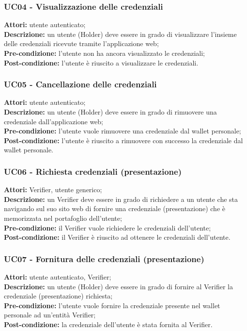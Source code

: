 \subsubsection{UC04 - Visualizzazione delle credenziali}
\textbf{Attori:} utente autenticato;\\
\textbf{Descrizione:} un utente (Holder) deve essere in grado di visualizzare l'insieme delle credenziali ricevute tramite l'applicazione web;\\
\textbf{Pre-condizione:} l’utente non ha ancora visualizzato le credenziali;\\
\textbf{Post-condizione:} l’utente è riuscito a visualizzare le credenziali.

\subsubsection{UC05 - Cancellazione delle credenziali}
\textbf{Attori:} utente autenticato;\\
\textbf{Descrizione:} un utente (Holder) deve essere in grado di rimuovere una credenziale dall'applicazione web;\\
\textbf{Pre-condizione:} l’utente vuole rimuovere una credenziale dal wallet personale;\\
\textbf{Post-condizione:} l’utente è riuscito a rimuovere con successo la credenziale dal wallet personale.

\subsubsection{UC06 - Richiesta credenziali (presentazione)}
\textbf{Attori:} Verifier, utente generico;\\
\textbf{Descrizione:} un Verifier deve essere in grado di richiedere a un utente che sta navigando sul suo sito web di fornire una credenziale (presentazione) che è memorizzata nel portafoglio dell'utente;\\
\textbf{Pre-condizione:} il Verifier vuole richiedere le credenziali dell’utente;\\
\textbf{Post-condizione:} il Verifier è riuscito ad ottenere le credenziali dell’utente.

\subsubsection{UC07 - Fornitura delle credenziali (presentazione)}
\textbf{Attori:} utente autenticato, Verifier;\\
\textbf{Descrizione:} un utente (Holder) deve essere in grado di fornire al Verifier la credenziale (presentazione) richiesta;\\
\textbf{Pre-condizione:} l’utente vuole fornire la credenziale presente nel wallet personale ad un'entità Verifier;\\
\textbf{Post-condizione:} la credenziale dell’utente è stata fornita al Verifier.

